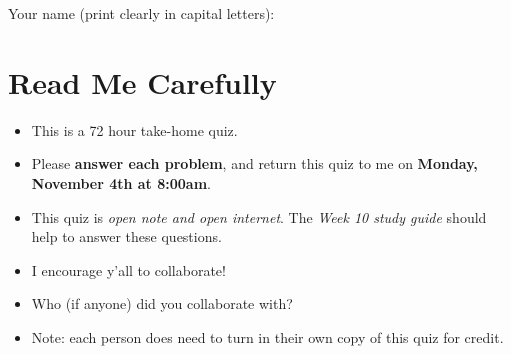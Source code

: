 \documentclass{ccg-topic}
\author{Colton Grainger}
\date{All Saints' Day 2019}
\begin{document}
\maketitle

Your name (print clearly in capital letters): \underline{\hspace{8cm}}

\section*{Read Me Carefully}
\begin{itemize}
    \item This is a 72 hour take-home quiz. 
    \item Please \textbf{answer each problem}, and return this quiz to me on \textbf{Monday, November 4th at 8:00am}.
    \item This quiz is \emph{open note and open internet}. The \emph{Week 10 study guide} should help to answer these questions.
    \item I encourage y'all to collaborate! 
    \item Who (if anyone) did you collaborate with? \underline{\hspace{10cm}}
    \item Note: each person does need to turn in their own copy of this quiz for credit.
\end{itemize}
\end{document}
